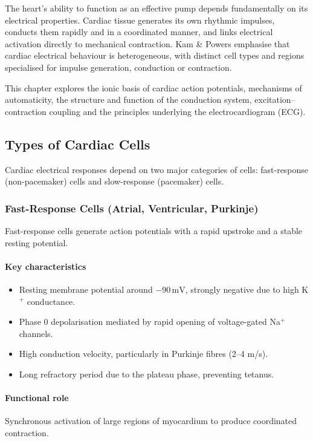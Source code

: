 \documentclass[11pt,a4paper]{article}
\begin{document}
The heart's ability to function as an effective pump depends fundamentally on its electrical properties. Cardiac tissue generates its own rhythmic impulses, conducts them rapidly and in a coordinated manner, and links electrical activation directly to mechanical contraction. Kam \& Powers emphasise that cardiac electrical behaviour is heterogeneous, with distinct cell types and regions specialised for impulse generation, conduction or contraction.

This chapter explores the ionic basis of cardiac action potentials, mechanisms of automaticity, the structure and function of the conduction system, excitation--contraction coupling and the principles underlying the electrocardiogram (ECG).

\subsection{Types of Cardiac Cells}

Cardiac electrical responses depend on two major categories of cells: fast-response (non-pacemaker) cells and slow-response (pacemaker) cells.

\subsubsection{Fast-Response Cells (Atrial, Ventricular, Purkinje)}

Fast-response cells generate action potentials with a rapid upstroke and a stable resting potential.

\paragraph{Key characteristics}
\begin{itemize}
  \item Resting membrane potential around $-90\,\text{mV}$, strongly negative due to high K$^+$ conductance.
  \item Phase 0 depolarisation mediated by rapid opening of voltage-gated Na$^+$ channels.
  \item High conduction velocity, particularly in Purkinje fibres (2--4 m/s).
  \item Long refractory period due to the plateau phase, preventing tetanus.
\end{itemize}

\paragraph{Functional role} Synchronous activation of large regions of myocardium to produce coordinated contraction.
\end{document}
